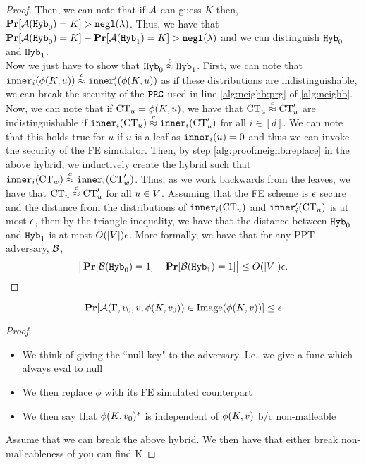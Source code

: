 \begin{lemma}
\begin{proof}
		Then, we can note that if $\mathcal{A}$ can guess $K$ then, $\operatorname*{\mathbf{Pr}}[\mathcal{A}(\texttt{Hyb}_0) = K] > \texttt{negl}(\lambda)$.
		Thus, we have that $\operatorname*{\mathbf{Pr}}[\mathcal{A}(\texttt{Hyb}_0) = K] - \operatorname*{\mathbf{Pr}}[\mathcal{A}(\texttt{Hyb}_1) = K] > \texttt{negl}(\lambda)$ and we can distinguish $\texttt{Hyb}_0$ and $\texttt{Hyb}_1$.	\\


		Now we just have to show that $\texttt{Hyb}_0 \overset{c}{\approx} \texttt{Hyb}_1$. First, we can note
		that $\texttt{inner}_i(\phi(K, u)) \overset{c}{\approx} \texttt{inner}_i'(\phi(K, u))$ as if these distributions are indistinguishable,
		we can break the security of the $\texttt{PRG}$ used in line \ref{alg:neighb:prg} of \cref{alg:neighb}. 
		Now, we can note that if $\text{CT}_u = \phi(K, u)$, we have that $\text{CT}_u \overset{c}{\approx} \text{CT}_u'$ are indistinguishable
		if $\texttt{inner}_i(\text{CT}_u) \overset{c}{\approx} \texttt{inner}_i(\text{CT}_u')$ for all $i \in [d]$. We can note that this holds true for
		$u$ if $u$ is a leaf as $\texttt{inner}_i(u) = 0$ and thus we can invoke the security of the FE simulator.
		Then, by step \ref{alg:proof:neighb:replace} in the above hybrid, we inductively create the hybrid
		such that $\texttt{inner}_i(\text{CT}_w) \overset{c}{\approx} \texttt{inner}_i(\text{CT}_w')$. Thus, as we work backwards from the leaves,
		we have that $\text{CT}_u \overset{c}{\approx} \text{CT}_u'$ for all $u \in V$. Assuming that the FE scheme is $\epsilon$ secure
		and the distance from the distributions of $\texttt{inner}_i(\text{CT}_u)$ and $\texttt{inner}_i'(\text{CT}_u)$ is at most $\epsilon$,
		then by the triangle inequality, we have that the distance between $\texttt{Hyb}_0$ and $\texttt{Hyb}_1$ is at most
		$O(|V|)\epsilon$.
		More formally, we have that for any PPT adversary, $\mathcal{B}$,
		\begin{equation*}
			\big| \operatorname*{\mathbf{Pr}}[\mathcal{B}(\texttt{Hyb}_0) = 1] - \operatorname*{\mathbf{Pr}}[\mathcal{B}(\texttt{Hyb}_1) = 1] \big| \leq O(|V|)\epsilon.
		\end{equation*}
	\end{proof}
\end{lemma}

\begin{lemma}
	\begin{equation*}
		\operatorname*{\mathbf{Pr}}[\mathcal{A}(\Gamma, v_0, v, \phi(K, v_0)) \in \text{Image}(\phi(K, v))] \leq \epsilon	
	\end{equation*}
	\begin{proof}
		\begin{itemize}
			\item We think of giving the ``null key" to the adversary. I.e.\ we give a func which always eval to null
			\item We then replace $\phi$ with its FE simulated counterpart
			\item We then say that $\phi(K, v_0)^*$ is independent of $\phi(K, v)$
			b/c non-malleable
		\end{itemize}
		Assume that we can break the above hybrid. We then have that either break non-malleableness of you can find K
	\end{proof}
\end{lemma}


